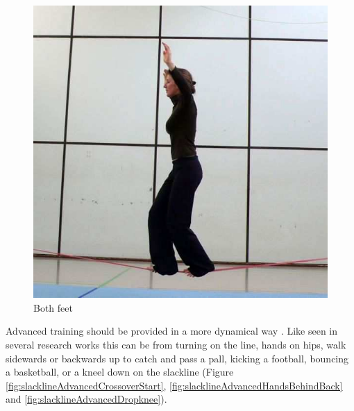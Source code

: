 \begin{figure}[htb]
\begin{minipage}[t]{0.33\linewidth}
		\includegraphics[width=1\linewidth]{Pictures/slacklineBasicBothFeet}
		\caption{Both feet \cite{Kroiss2007-ab}}
		\label{fig:slacklineBasicBothFeet}
	\end{minipage}
\end{figure}

Advanced training should be provided in a more dynamical way \cite{Thomann2013-aa}. Like seen in several research works \cite{Donath2013-kk} \cite{Donath2016-gm} \cite{Keller2012-xh} \cite{Granacher2010-ow} \cite{Pfusterschmied2013-yy} this can be from turning on the line, hands on hips, walk sidewards or backwards up to catch and pass a pall, kicking a football, bouncing a basketball, or a kneel down on the slackline (Figure \ref{fig:slacklineAdvancedCrossoverStart}, \ref{fig:slacklineAdvancedHandsBehindBack} and \ref{fig:slacklineAdvancedDropknee}).

